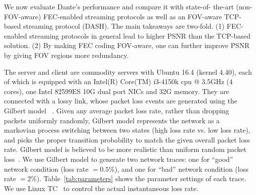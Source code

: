 \label{sec:eval}
We now evaluate Dante's performance and compare it with state-of-
the-art (non-FOV-aware) FEC-enabled streaming protocols as well 
as an FOV-aware TCP-based streaming protocol (DASH).
The main takeaways are two-fold. 
(1) FEC-enabled streaming protocols in general lead to higher 
PSNR than the TCP-based solution.
(2) By making FEC coding FOV-aware, one can further improve PSNR 
by giving FOV regions more redundancy.



The server and client are 
commodity servers with Ubuntu 16.4 (kernel 4.40), each of which 
is equipped with an Intel(R) Core(TM) i3-4150k cpu @ 3.5GHz (4 
cores), one Intel 82599ES 10G dual port NICs and 32G memory.
They are connected with a lossy link, whose packet loss events are
generated using the Gilbert 
model ~\cite{gilbert_model}. 
Given any average packet loss rate, 
rather than dropping packets uniformly randomly, Gilbert model 
represents the network as a markovian process switching between
two states (high loss rate vs. low loss rate), and picks
the proper transition probability to match the given overall 
packet loss rate. Gilbert model is believed to be more realistic than 
uniform random packet loss~\cite{bernoulli_VS_gilbert}.
We use Gilbert model to generate two 
network traces: one for ``good'' network condition (loss rate $=0.5\%$), and one for
``bad'' network condition (loss rate $=2\%$). 
Table~\ref{tab:parameters} shows the
parameter settings of each trace. 
We use Linux TC~\cite{TC} to control the actual instantaneous loss rate. 

